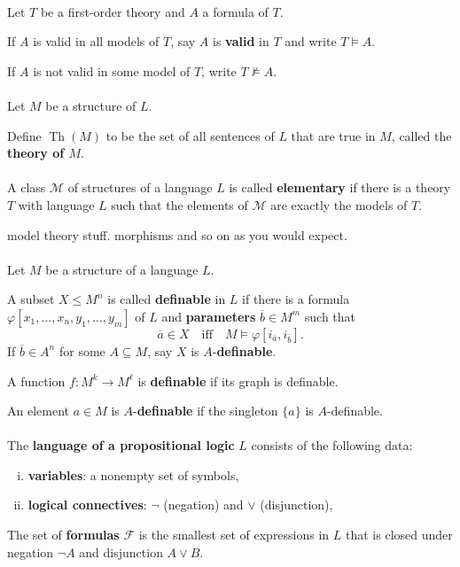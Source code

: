\documentclass[12pt]{article}
\newlength{\myparskip}
\newenvironment{fullbox}{\begin{lrbox}{\savefullbox}\begin{minipage}{\dimexpr\textwidth-2\fboxsep\relax}\setlength{\parskip}{\myparskip}}{\end{minipage}\end{lrbox}\framebox[\textwidth]{\usebox{\savefullbox}}}
\newenvironment{pbox}[1][]{\begin{fullbox}\def\temp{#1}\ifx\temp\empty\else\paragraph{#1}\phantom{}\fi}{\end{fullbox}}
\theoremstyle{definition}
\newcommand{\isp}[1]{\quad\text{#1}\quad}
\renewcommand{\phi}{\varphi}
\newcommand{\<}{\langle}
\renewcommand{\>}{\rangle}
\newcommand{\clo}{\overline}
\newcommand{\seq}{\subseteq}
\newcommand{\FF}{\mathcal{F}}
\newcommand{\keyword}{\textbf}
\begin{document}
\begin{pbox}
    Let $T$ be a first-order theory and $A$ a formula of $T$.

    If $A$ is valid in all models of $T$, say $A$ is \keyword{valid} in $T$ and write $T \vDash A$.

    If $A$ is not valid in some model of $T$, write $T \nvDash A$.
\end{pbox}

\begin{pbox}
    Let $M$ be a structure of $L$.
    
    Define $\operatorname{Th}(M)$ to be the set of all sentences of $L$ that are true in $M$, called the \keyword{theory of $M$}.
\end{pbox}

\begin{pbox}
    A class $\mathcal{M}$ of structures of a language $L$ is called \keyword{elementary} if there is a theory $T$ with language $L$ such that the elements of $\mathcal{M}$ are exactly the models of $T$.
\end{pbox}

model theory stuff. morphisms and so on as you would expect.

\begin{pbox}
    Let $M$ be a structure of a language $L$.

    A subset $X \leq M^n$ is called \keyword{definable} in $L$ if there is a formula $\phi[x_1, \dots, x_n, y_1, \dots, y_m]$ of $L$ and \keyword{parameters} $\clo{b} \in M^m$ such that 
    \[
        \clo{a} \in X \isp{iff} M \vDash \phi[i_{\clo{a}}, i_{\clo{b}}].
    \]
    If $\clo{b} \in A^n$ for some $A \seq M$, say $X$ is $A$-\keyword{definable}.

    A function $f : M^k \to M^\ell$ is \keyword{definable} if its graph is definable.

    An element $a \in M$ is $A$-\keyword{definable} if the singleton $\{a\}$ is $A$-definable.
\end{pbox}


\newpage

\begin{pbox}
    The \keyword{language of a propositional logic} $L$ consists of the following data:
    \begin{enumerate}[(i)]
        \item \keyword{variables}: a nonempty set of symbols,
        \item \keyword{logical connectives}: $\lnot$ (negation) and $\lor$ (disjunction),
    \end{enumerate}

    The set of \keyword{formulas} $\FF$ is the smallest set of expressions in $L$ that is closed under negation $\lnot A$ and disjunction $A \lor B$.
\end{pbox}
\end{document}
